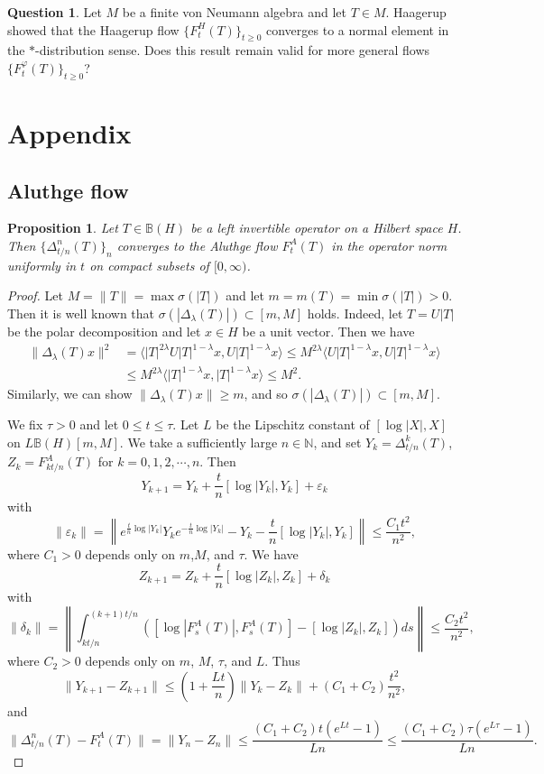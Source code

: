 \documentclass[12pt]{article}
\newtheorem{proposition}[theorem]{Proposition}
\theoremstyle{definition}
\newtheorem{question}[theorem]{Question}
\numberwithin{equation}{section}
\newcommand{\B}{\mathbb{B}}
\newcommand{\N}{\mathbb{N}}
\newcommand{\inpr}[2]{\langle{#1,#2}\rangle}
\begin{document}
\begin{question} Let $M$ be a finite von Neumann algebra and let $T\in M$. 
Haagerup \cite[Section 2]{HS2009} showed that the Haagerup flow $\{F^H_t(T)\}_{t\geq 0}$ converges to a normal element 
in the $*$-distribution sense. 
Does this result remain valid  for more general flows $\{F^\varphi_t(T)\}_{t\geq 0}$? 
\end{question}
\appendix
\section{Appendix}
\subsection{Aluthge flow}
\begin{proposition}\label{Aluthge}
Let $T\in \B(H)$ be a left invertible operator on a Hilbert space $H$. 
Then $\{\Delta_{t/n}^n(T)\}_n$ converges to the Aluthge flow $F^A_t(T)$ in the operator norm 
uniformly in $t$ on compact subsets of $[0,\infty)$. 
\end{proposition}

\begin{proof} Let $M=\|T\|=\max\sigma(|T|)$ and let $m=m(T)=\min\sigma(|T|)>0$. 
Then it is well known that $\sigma(|\Delta_\lambda(T)|)\subset [m,M]$ holds. 
Indeed, let $T=U|T|$ be the polar decomposition and let $x\in H$ be a unit vector. 
Then we have 
\begin{align*}
\|\Delta_\lambda(T)x\|^2 &=\inpr{|T|^{2\lambda}U|T|^{1-\lambda}x}{U|T|^{1-\lambda}x}\leq
 M^{2\lambda}\inpr{U|T|^{1-\lambda}x}{U|T|^{1-\lambda}x} \\
 &\leq  M^{2\lambda}\inpr{|T|^{1-\lambda}x}{|T|^{1-\lambda}x} \leq  M^2. 
\end{align*}
Similarly, we can show $\|\Delta_\lambda(T)x\|\geq m$, and so $\sigma(|\Delta_\lambda(T)|)\subset [m,M]$. 

We fix $\tau>0$ and let $0\leq t\leq \tau$. 
Let $L$ be the Lipschitz constant of $[\log |X|,X]$ on $L\B(H)[m,M]$. 
We take a sufficiently large $n\in \N$, and set $Y_k=\Delta_{t/n}^k(T)$, $Z_k=F^A_{kt/n}(T)$ for $k=0,1,2,\cdots,n$. 
Then 
\[Y_{k+1}=Y_k+\frac{t}{n}[\log |Y_k|,Y_k]+\varepsilon_k \] 
with 
\[\|\varepsilon_k\|=\left\|e^{\frac{t}{n}\log |Y_k|}Y_ke^{-\frac{t}{n}\log |Y_k|}-Y_k-\frac{t}{n}[\log |Y_k|,Y_k]\right\|\leq \frac{C_1t^2}{n^2},\]
where $C_1>0$ depends only on $m$,$M$, and $\tau$. 
We have 
\[Z_{k+1}=Z_k+\frac{t}{n}[\log|Z_k|,Z_k]+\delta_k\]
with 
\[\|\delta_k\|=\left\|\int_{kt/n}^{(k+1)t/n}([\log|F^A_s(T)|,F^A_s(T)]-[\log|Z_k|,Z_k])ds\right\|\leq\frac{C_2t^2}{n^2},\]
where $C_2>0$ depends only on $m$, $M$, $\tau$, and $L$. 
Thus 
\[\|Y_{k+1}-Z_{k+1}\|\leq \left(1+\frac{Lt}{n}\right)\|Y_k-Z_k\|+(C_1+C_2)\frac{t^2}{n^2},\]
and 
\[\|\Delta_{t/n}^n(T)-F^A_t(T)\|=\|Y_n-Z_n\|\leq \frac{(C_1+C_2)t(e^{Lt}-1)}{Ln}\leq \frac{(C_1+C_2)\tau (e^{L\tau}-1)}{Ln}.\]
\end{proof}
\end{document}
